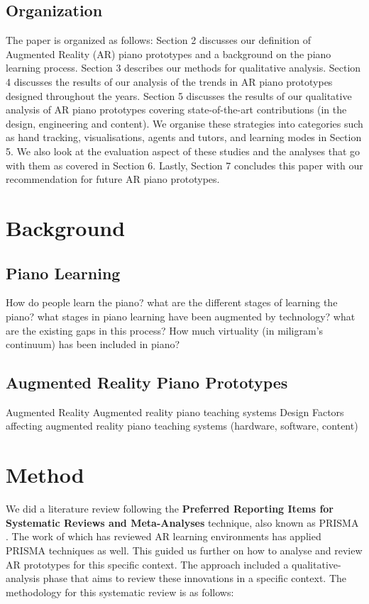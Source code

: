 \documentclass[manuscript,screen]{acmart}
\begin{document}
\subsection{Organization}
The paper is organized as follows: Section 2 discusses our definition of Augmented Reality (AR) piano prototypes and a background on the piano learning process. Section 3 describes our methods for qualitative analysis. Section 4 discusses the results of our analysis of the trends in AR piano prototypes designed throughout the years. Section 5 discusses the results of our qualitative analysis of AR piano prototypes covering state-of-the-art contributions (in the design, engineering and content). We organise these strategies into categories such as hand tracking, visualisations, agents and tutors, and learning modes in Section 5. We also look at the evaluation aspect of these studies and the analyses that go with them as covered in Section 6. Lastly, Section 7 concludes this paper with our recommendation for future AR piano prototypes. 





\section{Background}
\subsection{Piano Learning}
How do people learn the piano? what are the different stages of learning the piano? what stages in piano learning have been augmented by technology? what are the existing gaps in this process? How much virtuality (in miligram's continuum) has been included in piano? 

\subsection{Augmented Reality Piano Prototypes}
Augmented Reality
Augmented reality piano teaching systems
Design Factors affecting augmented reality piano teaching systems (hardware, software, content)

\section{Method}

We did a literature review following the \textbf{Preferred Reporting Items for Systematic Reviews and Meta-Analyses} technique, also known as PRISMA \cite{moher2009preferred}. The work of \citet{santos2013augmented} which has reviewed AR learning environments has applied PRISMA techniques as well. This guided us further on how to analyse and review AR prototypes for this specific context. The approach included a  qualitative-analysis phase that aims to review these innovations in a specific context. The methodology for this systematic review is as follows: 
\end{document}
